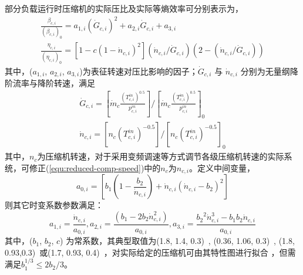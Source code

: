 部分负载运行时压缩机的实际压比及实际等熵效率可分别表示为\cite{Compressor-thermo-02,A-CAES-Dynamic-17}，
\begin{subequations}
\label{eq:com-iso-eff-off}
\begin{gather}
\frac{{{\beta _{c,i}}}}{{{{({{\beta _{c,i}}})}_0}}} = {a_{1,i}}{({{{\dot G}_{c,i}}})^2} + {a_{2,i}}{\dot G_{c,i}} + {a_{3,i}}\label{equ:comp-press-part}\\
\frac{{{\eta _{c,i}}}}{{{{({{\eta _{c,i}}})}_0}}} = [{1 - c{{({1 - {{\dot n}_{c,i}}})}^2}}]({{{\dot n}_{c,i}}/{{\dot G}_{c,i}}})({2 -({{{\dot n}_{c,i}}/{{\dot G}_{c,i}}})})\label{equ:comp-eff-part}
\end{gather}
\end{subequations}
其中，($a_{1,i}$, $a_{2,i}$, $a_{3,i}$)为表征转速对压比影响的因子；${\dot G_{c,i}}$ 与 ${\dot n_{c,i}}$ 分别为无量纲降阶流率与降阶转速，满足
\begin{subequations}
\label{eq:com-mass-off}
\begin{gather}
{\dot G_{c,i}} = [{{{\dot m}_c}\frac{{{{({T_{c,i}^{in}})}^{0.5}}}}{{p_{c,i}^{in}}}}]/{[{{{\dot m}_c}\frac{{{{({T_{c,i}^{in}})}^{0.5}}}}{{p_{c,i}^{in}}}}]_0}\label{equ:reduced-comp-mass-flow}\\
{\dot n_{c,i}} = [{{n_c}{{({T_{c,i}^{in}})}^{-0.5}}}]/{[{{n_c}{{({T_{c,i}^{in}})}^{-0.5}}}]_0}\label{equ:reduced-comp-speed}
\end{gather}
\end{subequations}
其中，$n_c$为压缩机转速，对于采用变频调速等方式调节各级压缩机转速的实际系统，可修正(\ref{equ:reduced-comp-speed})中的$n_c$为$n_{c,i}$。定义中间变量，
\begin{equation}
\label{equ:comp-mid-var-1}
{a_{0,i}} = [{{b_1}({1 - \frac{{{b_2}}}{{{{\dot n}_{c,i}}}}}) + {{\dot n}_{c,i}}{{({{{\dot n}_{c,i}} - {b_2}})}^2}}]
\end{equation}
则其它时变系数参数满足：
\begin{equation}
\label{equ:comp-mid-var-2}
{a_{1,i}} = \frac{{{{\dot n}_{c,i}}}}{{{a_{0,i}}}}, {a_{2,i}} = \frac{{({{b_1} - 2{b_2}\dot n_{c,i}^2})}}{{{a_{0,i}}}}, {a_{3,i}} = \frac{{{b_2}^2\dot n_{c,i}^3 - {b_1}{b_2}{{\dot n}_{c,i}}}}{{{a_{0,i}}}}
\end{equation}
其中，($b_1$, $b_2$, $c$) 为常系数，其典型取值为(1.8, 1.4, 0.3)~\cite{Compressor-thermo-02}, (0.36, 1.06, 0.3)~\cite{A-CAES-Dynamic-17}, (1.8, 0.93,0.3)~\cite{AA-CAES-Simulation-19}或(1.7, 0.93, 0.4)~\cite{AA-CAES-Simulation-19}，对实际给定的压缩机可由其特性图进行拟合
\cite{Compressor-Off-Design-05}，但需满足$b_1^{1/3}\le 2b_2/3$。

